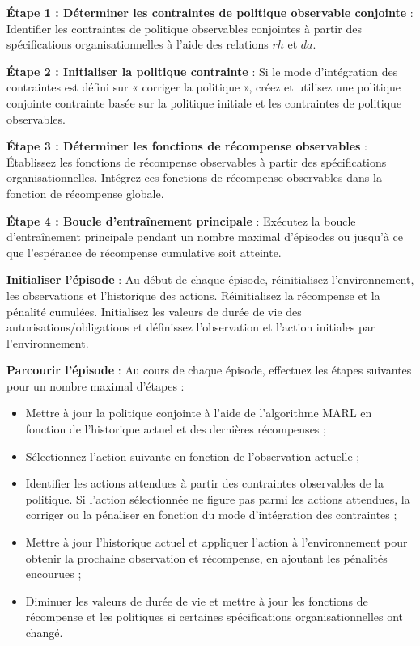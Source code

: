 \textbf{Étape 1 : Déterminer les contraintes de politique observable conjointe} :
Identifier les contraintes de politique observables conjointes à partir des spécifications organisationnelles à l'aide des relations $rh$ et $da$.

\textbf{Étape 2 : Initialiser la politique contrainte} :
Si le mode d'intégration des contraintes est défini sur « corriger la politique », créez et utilisez une politique conjointe contrainte basée sur la politique initiale et les contraintes de politique observables.

\textbf{Étape 3 : Déterminer les fonctions de récompense observables} :
Établissez les fonctions de récompense observables à partir des spécifications organisationnelles. Intégrez ces fonctions de récompense observables dans la fonction de récompense globale.

\textbf{Étape 4 : Boucle d'entraînement principale} :
Exécutez la boucle d'entraînement principale pendant un nombre maximal d'épisodes ou jusqu'à ce que l'espérance de récompense cumulative soit atteinte.

\textbf{Initialiser l'épisode} :
Au début de chaque épisode, réinitialisez l'environnement, les observations et l'historique des actions. Réinitialisez la récompense et la pénalité cumulées. Initialisez les valeurs de durée de vie des autorisations/obligations et définissez l'observation et l'action initiales par l'environnement.

\textbf{Parcourir l'épisode} :
Au cours de chaque épisode, effectuez les étapes suivantes pour un nombre maximal d'étapes :

\begin{itemize}
    \item Mettre à jour la politique conjointe à l'aide de l'algorithme MARL en fonction de l'historique actuel et des dernières récompenses ;
    \item Sélectionnez l'action suivante en fonction de l'observation actuelle ;
    \item Identifier les actions attendues à partir des contraintes observables de la politique. Si l'action sélectionnée ne figure pas parmi les actions attendues, la corriger ou la pénaliser en fonction du mode d'intégration des contraintes ;
    \item Mettre à jour l'historique actuel et appliquer l'action à l'environnement pour obtenir la prochaine observation et récompense, en ajoutant les pénalités encourues ;
    \item Diminuer les valeurs de durée de vie et mettre à jour les fonctions de récompense et les politiques si certaines spécifications organisationnelles ont changé.
\end{itemize}

